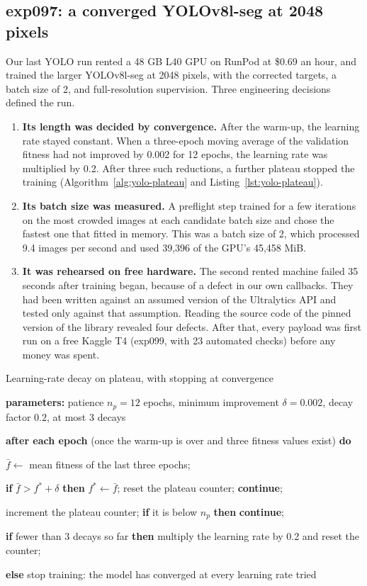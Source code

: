 \subsection{exp097: a converged YOLOv8l-seg at 2048 pixels}\label{sec:yolo-exp097}
Our last YOLO run rented a 48 GB L40 GPU on RunPod at \$0.69 an hour, and trained the larger
YOLOv8l-seg at 2048 pixels, with the corrected targets, a batch size of 2, and full-resolution
supervision. Three engineering decisions defined the run.
\begin{enumerate}[leftmargin=*,itemsep=2pt]
\item \textbf{Its length was decided by convergence.} After the warm-up, the
learning rate stayed constant. When a three-epoch moving average of the validation fitness had not
improved by 0.002 for 12 epochs, the learning rate was multiplied by 0.2. After three such
reductions, a further plateau stopped the training (Algorithm~\ref{alg:yolo-plateau} and
Listing~\ref{lst:yolo-plateau}).
\item \textbf{Its batch size was measured.} A preflight step trained for a few iterations on the most
crowded images at each candidate batch size and chose the fastest one that fitted in memory. This was
a batch size of 2, which processed 9.4 images per second and used 39,396 of the GPU's 45,458 MiB.
\item \textbf{It was rehearsed on free hardware.} The second rented machine failed 35 seconds after
training began, because of a defect in our own callbacks. They had been written against an assumed
version of the Ultralytics API and tested only against that assumption. Reading the source code of
the pinned version of the library revealed four defects. After that, every payload was first run on
a free Kaggle T4 (exp099, with 23 automated checks) before any money was spent.
\end{enumerate}

\begin{algorithmblock}{Learning-rate decay on plateau, with stopping at convergence\label{alg:yolo-plateau}}
\item \textbf{parameters:} patience $n_p=12$ epochs, minimum improvement $\delta=0.002$, decay factor $0.2$, at most 3 decays
\item \textbf{after each epoch} (once the warm-up is over and three fitness values exist) \textbf{do}
\item \Ind $\bar f\leftarrow$ mean fitness of the last three epochs;
\item \Ind \textbf{if} $\bar f>f^{\ast}+\delta$ \textbf{then} $f^{\ast}\leftarrow\bar f$; reset the plateau counter; \textbf{continue};
\item \Ind increment the plateau counter; \textbf{if} it is below $n_p$ \textbf{then} \textbf{continue};
\item \Ind \textbf{if} fewer than 3 decays so far \textbf{then} multiply the learning rate by 0.2 and reset the counter;
\item \Ind \textbf{else} stop training: the model has converged at every learning rate tried
\end{algorithmblock}

